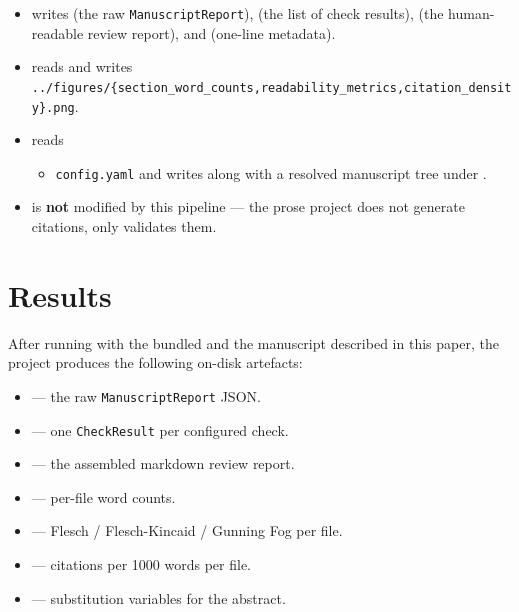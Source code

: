 \documentclass[
]{article}
\providecommand{\tightlist}{%
  \setlength{\itemsep}{0pt}\setlength{\parskip}{0pt}}
\begin{document}
\begin{itemize}
\tightlist
\item
   writes
   (the raw
  \texttt{ManuscriptReport}),  (the list of
  check results),  (the human-readable
  review report), and  (one-line
  metadata).
\item
   reads
   and writes
  \texttt{../figures/\{section\_word\_counts,readability\_metrics,citation\_density\}.png}.
\item
   reads

  \begin{itemize}
  \tightlist
  \item
    \texttt{config.yaml} and writes
     along with a
    resolved manuscript tree under .
  \end{itemize}
\item
   is \textbf{not} modified by this
  pipeline --- the prose project does not generate citations, only
  validates them.
\end{itemize}

\newpage

\section{Results}\label{sec:results}

After running  with the bundled
 and the manuscript described in this
paper, the project produces the following on-disk artefacts:

\begin{itemize}
\tightlist
\item
   --- the raw
  \texttt{ManuscriptReport} JSON.
\item
   --- one \texttt{CheckResult} per
  configured check.
\item
   --- the assembled markdown review
  report.
\item
   --- per-file word
  counts.
\item
   --- Flesch /
  Flesch-Kincaid / Gunning Fog per file.
\item
   --- citations per 1000 words
  per file.
\item
   --- substitution
  variables for the abstract.
\end{itemize}
\end{document}

